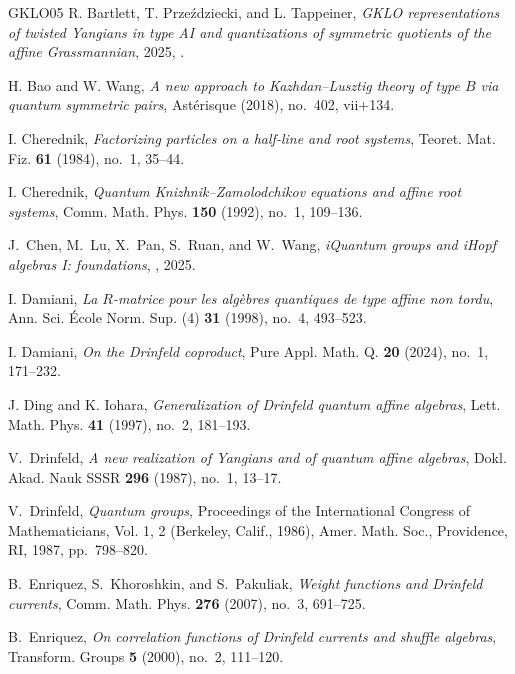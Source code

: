 \documentclass[reqno]{amsart}
\numberwithin{equation}{section}
\begin{document}
\begin{thebibliography}{GKLO05}
R. Bartlett, T. Prze\'{z}dziecki, and L. Tappeiner, \emph{{GKLO}
	representations of twisted {Y}angians in type {AI} and quantizations of
	symmetric quotients of the affine {G}rassmannian}, 2025, .

H. Bao and W. Wang, \emph{A new approach to {K}azhdan--{L}usztig
	theory of type {$B$} via quantum symmetric pairs}, Ast\'{e}risque (2018),
no.~402, vii+134.

I. Cherednik, \emph{Factorizing particles on a half-line and root systems},
Teoret. Mat. Fiz. \textbf{61} (1984), no.~1, 35--44.

I. Cherednik, \emph{Quantum {K}nizhnik--{Z}amolodchikov equations and affine
	root systems}, Comm. Math. Phys. \textbf{150} (1992), no.~1, 109--136.

J.~Chen, M.~Lu, X.~Pan, S.~Ruan, and W.~Wang, \emph{i{Q}uantum groups and
	i{H}opf algebras I: foundations},
, 2025.

I. Damiani, \emph{La {$R$}-matrice pour les alg\`ebres quantiques de type
	affine non tordu}, Ann. Sci. \'Ecole Norm. Sup. (4) \textbf{31} (1998),
no.~4, 493--523. 

I. Damiani, \emph{On the {D}rinfeld coproduct}, Pure Appl. Math. Q. \textbf{20}
(2024), no.~1, 171--232. 

J. Ding and K. Iohara, \emph{Generalization of {D}rinfeld quantum affine
	algebras}, Lett. Math. Phys. \textbf{41} (1997), no.~2, 181--193.

V.~Drinfeld, \emph{A new realization of {Y}angians and of quantum affine
	algebras}, Dokl. Akad. Nauk SSSR \textbf{296} (1987), no.~1, 13--17.

V.~Drinfeld, \emph{Quantum groups}, Proceedings of the {I}nternational {C}ongress
of {M}athematicians, {V}ol. 1, 2 ({B}erkeley, {C}alif., 1986), Amer. Math.
Soc., Providence, RI, 1987, pp.~798--820. 

B.~Enriquez, S.~Khoroshkin, and S.~Pakuliak, \emph{Weight functions and
	{D}rinfeld currents}, Comm. Math. Phys. \textbf{276} (2007), no.~3, 691--725.

B.~Enriquez, \emph{On correlation functions of {D}rinfeld currents
	and shuffle algebras}, Transform. Groups \textbf{5} (2000), no.~2,
111--120.


\end{thebibliography}
\end{document}
